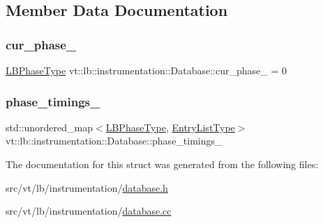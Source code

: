 \subsection{Member Data Documentation}
\mbox{\label{structvt_1_1lb_1_1instrumentation_1_1_database_accff0a340e53d9456af09f1e2751e561}} 
\subsubsection{\texorpdfstring{cur\+\_\+phase\+\_\+}{cur\_phase\_}}
{\footnotesize\ttfamily \hyperlink{namespacevt_a5505d0bab25ce2ff566a8e015871b379}{L\+B\+Phase\+Type} vt\+::lb\+::instrumentation\+::\+Database\+::cur\+\_\+phase\+\_\+ = 0\hspace{0.3cm}{\ttfamily [private]}}

\mbox{\label{structvt_1_1lb_1_1instrumentation_1_1_database_ab19c0b8e6af9cd204eddc1c1ce4710eb}} 
\subsubsection{\texorpdfstring{phase\+\_\+timings\+\_\+}{phase\_timings\_}}
{\footnotesize\ttfamily std\+::unordered\+\_\+map$<$\hyperlink{namespacevt_a5505d0bab25ce2ff566a8e015871b379}{L\+B\+Phase\+Type}, \hyperlink{structvt_1_1lb_1_1instrumentation_1_1_database_af27c1e929c54fd378f84978cbe9360a7}{Entry\+List\+Type}$>$ vt\+::lb\+::instrumentation\+::\+Database\+::phase\+\_\+timings\+\_\+\hspace{0.3cm}{\ttfamily [private]}}



The documentation for this struct was generated from the following files\+:\begin{DoxyCompactItemize}
\item 
src/vt/lb/instrumentation/\hyperlink{database_8h}{database.\+h}\item 
src/vt/lb/instrumentation/\hyperlink{database_8cc}{database.\+cc}\end{DoxyCompactItemize}
